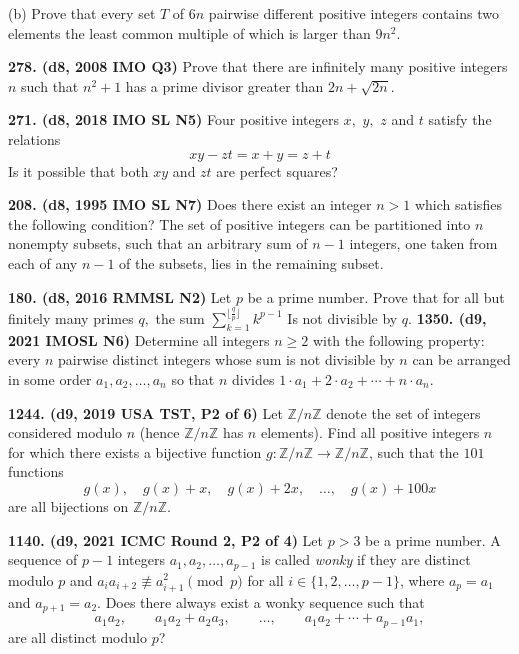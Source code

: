 \documentclass{article}
\begin{document}
(b) Prove that every set $T$ of $6n$ pairwise different positive integers contains two elements the least common multiple of which is larger than $9n^2$.

\textbf{278. (\color{red}d8\color{black}, 2008 IMO Q3)} Prove that there are infinitely many positive integers $n$ such that $n^{2} + 1$ has a prime divisor greater than $2n + \sqrt{2n}.$

\textbf{271. (\color{red}d8\color{black}, 2018 IMO SL N5)} Four positive integers $x,$ $y,$ $z$ and $t$ satisfy the relations $$xy - zt = x + y = z + t$$ Is it possible that both $xy$ and $zt$ are perfect squares?

\textbf{208. (\color{red}d8\color{black}, 1995 IMO SL N7)} Does there exist an integer $n > 1$ which satisfies the following condition? The set of positive integers can be partitioned into $n$ nonempty subsets, such that an arbitrary sum of $n - 1$ integers, one taken from each of any $n - 1$ of the subsets, lies in the remaining subset.

\textbf{180. (\color{red}d8\color{black}, 2016 RMMSL N2)} Let $p$ be a prime number. Prove that for all but finitely many primes $q,$ the sum
$\sum_{k=1}^{\lfloor{\frac{q}{p}}\rfloor}  {k^{p - 1}}$
Is not divisible by $q$.
\textbf{1350. (\color{red}d9\color{black}, 2021 IMOSL N6)} Determine all integers
$n \geq 2$ with the following property:
every $n$ pairwise distinct integers whose sum
is not divisible by $n$ can be arranged in
some order $a_1,a_2,\ldots, a_n$ so that $n$
divides $1\cdot a_1+2\cdot a_2+\cdots+n\cdot a_n$.

\textbf{1244. (\color{red}d9\color{black}, 2019 USA TST, P2 of 6)} Let $\mathbb{Z}/n\mathbb{Z}$ denote the set of integers considered modulo $n$ (hence $\mathbb{Z}/n\mathbb{Z}$ has $n$ elements). Find all positive integers $n$ for which there exists a bijective function $g: \mathbb{Z}/n\mathbb{Z} \to \mathbb{Z}/n\mathbb{Z}$, such that the $101$ functions \[g(x),\quad g(x)+x,\quad g(x)+2x,\quad \dots,\quad g(x)+100x\] are all bijections on $\mathbb{Z}/n\mathbb{Z}$.

\textbf{1140. (\color{red}d9\color{black}, 2021 ICMC Round 2, P2 of 4)} Let $p > 3$ be a prime number. A sequence of $p-1$ integers $a_1,a_2, \dots, a_{p-1}$ is called \emph{wonky} if they are distinct modulo \(p\) and $a_ia_{i+2} \not\equiv a_{i+1}^2 \pmod p$ for all \(i \in \{1, 2, \dots, p-1\}\), where \(a_p = a_1\) and \(a_{p+1} = a_2\). Does there always exist a wonky sequence such that $$a_1a_2, \qquad a_1a_2+a_2a_3, \qquad \dots, \qquad a_1a_2+\cdots +a_{p-1}a_1,$$are all distinct modulo $p$?
\end{document}
